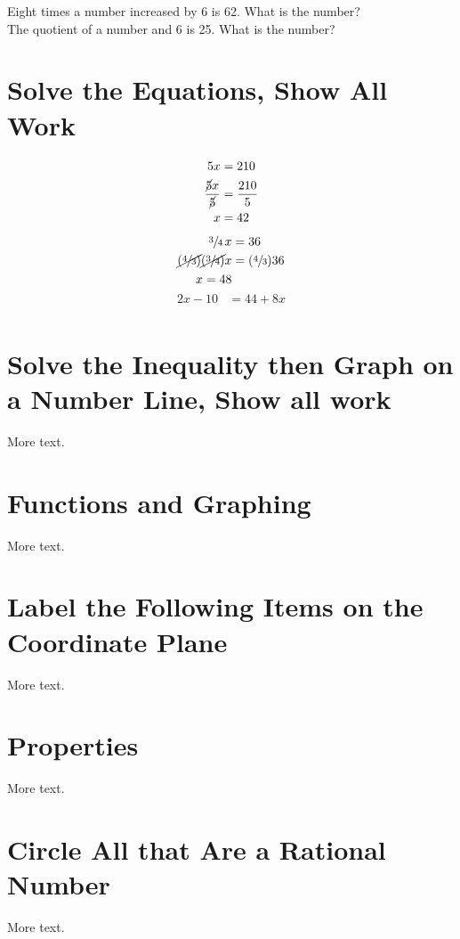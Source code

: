 \documentclass[11pt]{article} %
\begin{document}
Eight times a number increased by 6 is 62. What is the number? \\


\noindent The quotient of a number and 6 is 25. What is the number?

\section{Solve the Equations, Show All Work}
\begin{align*}
5x &= 210 \\
 \frac{\cancel{5}x}{\cancel{5}} &= \frac{210}{5} \\
x&=42
\end{align*}
\begin{align*}
\sfrac{3}{4} \, x &= 36 \\
\cancel{(\sfrac{4}{3})}\cancel{(\sfrac{3}{4})}x &= (\sfrac{4}{3}) 36 \\
 x=48
\end{align*}
\begin{align*}
2x - 10 &= 44 + 8x \\
\end{align*}

\section{Solve the Inequality then Graph on a Number Line, Show all work}

More text.

\section{Functions and Graphing}

More text.

\section{Label the Following Items on the Coordinate Plane}

More text.

\section{Properties}

More text.

\section{Circle All that Are a Rational Number}

More text.
\end{document}
